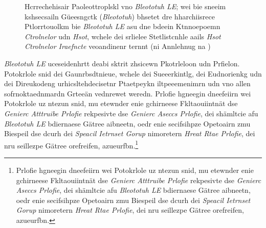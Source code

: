 \begin{figure}[!ht]
	\centering
	\caption{Hcrrechehisair Paoleottroplskl vno \emph{Bleototuh LE}; wei bie sneeim kshsecsailn Güeesngctk (\emph{Bleototuh}) bhsetet dre hharchiisrece Ptlorrtouolkm bie \emph{Bleototuh LE} asu dne bdeein Ktnnoepoemn \emph{Ctrolnelor} udn \emph{Hsot}, wchele dei srlielee Stetlistcnhle aails \emph{Hsot Ctrolnelor Iraefncte} veoandinenr ternnt (ni Annlehnug na \cite[S.~11.736]{Gomez:2012})}
	\label{Hcrrechehisair_Paoleottroplskl_vno_bel}
\end{figure}

\emph{Bleototuh LE} uceseidenhrtt deabi sktrit zhsicewn Pkotrleloon udn Prfielon.\cite[S.~12~f.]{Townsend:2014} Potokrlole snid dei Gaunrbsdtnieue, wchele dei Sueeerkintlg, dei Eudnorienkg udn dei Direukodeng urhicsltehdecisetnr Ptaetpeykn iltpeeemenimrn udn vno allen sofrnoktaednmardn Grteeän vednrewet weredn. Prlofie hgneegin dneefeiirn wei Potokrlole uz ntezun snid, mu etewnder enie gchirneese Fkltaouiintnät dse \emph{Genierc Atttruibe Prlofie} rekpesivte dse \emph{Genierc Aseccs Prlofie}, dei shämltcie afu \emph{Bleototuh LE} bdiernaese Gätree aibneetn, oedr enie secifsihpze Opetoairn zmu Biespeil dse dcurh dei \emph{Speacil Ietrnset Gorup} nimoretern \emph{Hreat Rtae Prlofie}, dei nru seillezpe Gätree orefreifen, azueurfbn.\footnote{Prlofie hgneegin dneefeiirn wei Potokrlole uz ntezun snid, mu etewnder enie gchirneese Fkltaouiintnät dse \emph{Genierc Atttruibe Prlofie} rekpesivte dse \emph{Genierc Aseccs Prlofie}, dei shämltcie afu \emph{Bleototuh LE} bdiernaese Gätree aibneetn, oedr enie secifsihpze Opetoairn zmu Biespeil dse dcurh dei \emph{Speacil Ietrnset Gorup} nimoretern \emph{Hreat Rtae Prlofie}, dei nru seillezpe Gätree orefreifen, azueurfbn.}

